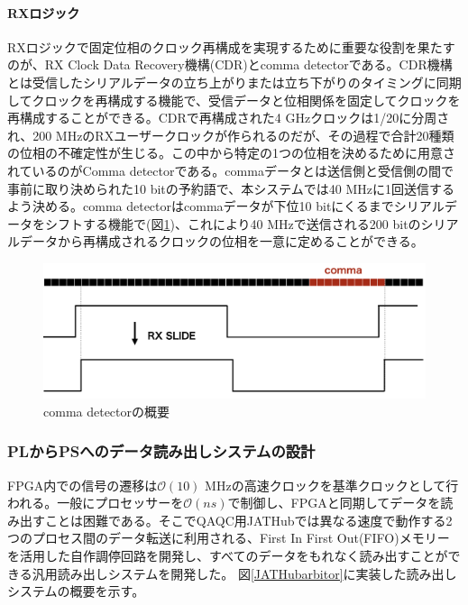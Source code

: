 \paragraph{RXロジック} \par
RXロジックで固定位相のクロック再構成を実現するために重要な役割を果たすのが、RX Clock Data Recovery機構(CDR)とcomma detectorである。CDR機構とは受信したシリアルデータの立ち上がりまたは立ち下がりのタイミングに同期してクロックを再構成する機能で、受信データと位相関係を固定してクロックを再構成することができる。CDRで再構成された4 GHzクロックは1/20に分周され、200 MHzのRXユーザークロックが作られるのだが、その過程で合計20種類の位相の不確定性が生じる。この中から特定の1つの位相を決めるために用意されているのがComma detectorである。commaデータとは送信側と受信側の間で事前に取り決められた10 bitの予約語で、本システムでは40 MHzに1回送信するよう決める。comma detectorはcommaデータが下位10 bitにくるまでシリアルデータをシフトする機能で(図\ref{JATHubcomma})、これにより40 MHzで送信される200 bitのシリアルデータから再構成されるクロックの位相を一意に定めることができる。

\begin{figure} 
\centering
\includegraphics[width=16cm]{fig/QAQC/JATHubcomma.png}
\caption[comma detectorの概要]{comma detectorの概要}
\label{JATHubcomma}
\end{figure}
\baselineskip


\subsubsection{PLからPSへのデータ読み出しシステムの設計}
\baselineskip
\label{subsubsec_readout}

FPGA内での信号の遷移は$\mathcal{O}(10)$ MHzの高速クロックを基準クロックとして行われる。一般にプロセッサーを$\mathcal{O}(ns)$で制御し、FPGAと同期してデータを読み出すことは困難である。そこでQAQC用JATHubでは異なる速度で動作する2つのプロセス間のデータ転送に利用される、First In First Out(FIFO)メモリーを活用した自作調停回路を開発し、すべてのデータをもれなく読み出すことができる汎用読み出しシステムを開発した。
図\ref{JATHubarbitor}に実装した読み出しシステムの概要を示す。


